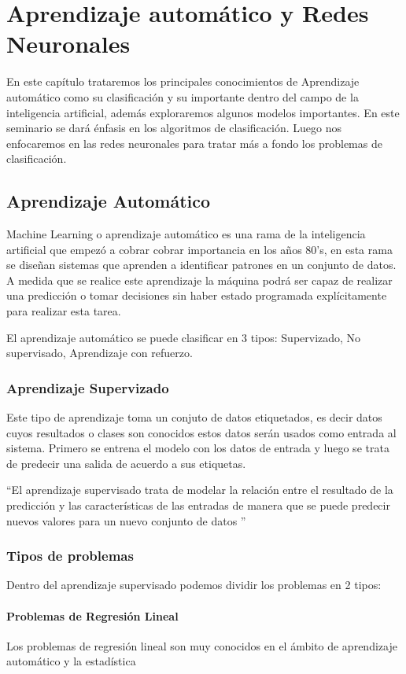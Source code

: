 \chapter{Aprendizaje automático y Redes Neuronales}

En este capítulo trataremos los principales conocimientos de Aprendizaje automático como su clasificación y su importante dentro del campo de la inteligencia artificial, además exploraremos algunos modelos importantes. 
En este seminario se dará énfasis en los algoritmos de clasificación. Luego nos enfocaremos en las redes neuronales para tratar más a fondo los problemas de clasificación.

\section{Aprendizaje Automático}
Machine Learning o aprendizaje automático es una rama de la inteligencia artificial que empezó a cobrar cobrar importancia en los años 80's, en esta rama se diseñan sistemas que aprenden a identificar patrones en un conjunto de datos. A medida que se realice este aprendizaje la máquina podrá ser capaz de realizar una predicción o tomar decisiones sin haber estado programada explícitamente para realizar esta tarea.


El aprendizaje automático se puede clasificar en 3 tipos: Supervizado, No supervisado, Aprendizaje con refuerzo.\cite{WEBSITE:2}
\subsection{Aprendizaje Supervizado}
Este tipo de aprendizaje  toma un conjuto de datos etiquetados, es decir datos cuyos resultados o clases son conocidos estos datos serán usados como entrada al sistema. Primero se entrena el modelo con los datos de entrada y luego se trata de predecir  una salida de acuerdo a sus etiquetas.

 \textquotedblleft El aprendizaje supervisado trata de modelar la relación entre el resultado de la predicción y las características de las entradas de manera que se puede predecir nuevos valores para un nuevo conjunto de datos \textquotedblright \cite{WEBSITE:1}
\subsection*{Tipos de problemas}
Dentro del aprendizaje supervisado podemos dividir los problemas en 2 tipos:
\subsubsection*{Problemas de Regresión Lineal}
Los problemas de regresión lineal son muy conocidos en el ámbito de aprendizaje automático y la estadística 

